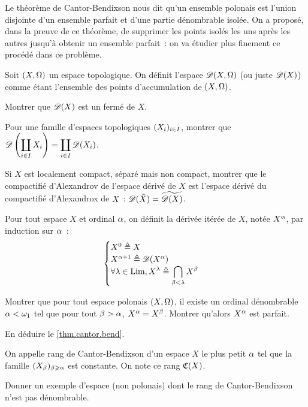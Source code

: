 \begin{problem}
  Le théorème de Cantor-Bendixson nous dit qu'un ensemble polonais est l'union
  disjointe d'un ensemble parfait et d'une partie dénombrable isolée. On a
  proposé, dans la preuve de ce théorème, de supprimer les points isolés les uns
  après les autres jusqu'à obtenir un ensemble parfait~: on va étudier plus
  finement ce procédé dans ce problème.


  Soit $(X,\Omega)$ un espace topologique. On définit l'espace $\mathscr{D}(X,\Omega)$
  (ou juste $\mathscr{D}(X)$) comme étant l'ensemble des points d'accumulation de
  $(X,\Omega)$.
  \begin{pbQuest}
  \item Montrer que $\mathscr{D}(X)$ est un fermé de $X$.
  \item Pour une famille d'espaces topologiques $(X_i)_{i \in I}$, montrer
    que
    $\displaystyle\mathscr{D}\left(\coprod_{i \in I} X_i\right) =
    \coprod_{i \in I}\mathscr{D}(X_i)$.
  \item Si $X$ est localement compact, séparé mais non compact, montrer que
    le compactifié d'Alexandrov de l'espace dérivé de $X$ est l'espace dérivé du
    compactifié d'Alexandrox de $X$~: $\mathscr{D}(\tilde{X})=\widetilde{\mathscr{D}(X)}$.
  \end{pbQuest}

  Pour tout espace $X$ et ordinal $\alpha$, on définit la dérivée itérée de $X$,
  notée $X^{\alpha}$, par induction sur $\alpha$~:
  \[\begin{cases}
  X^0 \triangleq X \\
  X^{\alpha+1} \triangleq \mathscr{D}(X^{\alpha})\\
  \displaystyle
  \forall \lambda\in\operatorname{Lim}, X^{\lambda} \triangleq \bigcap_{\beta < \lambda} X^{\beta}
  \end{cases}\]
  \begin{pbQuest}[resume]
  \item Montrer que pour tout espace polonais $(X,\Omega)$, il existe un ordinal
    dénombrable $\alpha < \omega_1$ tel que pour tout $\beta > \alpha$,
    $X^{\alpha} = X^{\beta}$. Montrer qu'alors $X^{\alpha}$ est parfait.
  \item En déduire le \cref{thm.cantor.bend}.
  \end{pbQuest}

  On appelle rang de Cantor-Bendixson d'un espace $X$ le plus petit $\alpha$
  tel que la famille $(X_{\beta})_{\beta \geqslant \alpha}$ est constante. On note ce
  rang $\mathfrak{C}(X)$.
  \begin{pbQuest}[resume]
  \item Donner un exemple d'espace (non polonais) dont le rang de
    Cantor-Bendixson n'est pas dénombrable.
  \end{pbQuest}


\end{problem}
